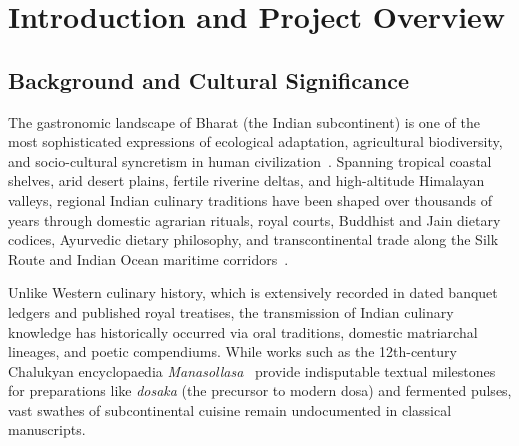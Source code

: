 \documentclass[11pt,a4paper]{report}
\begin{document}
\clearpage

\tableofcontents
\clearpage

\listoffigures
\vspace{1cm}
\listoftables
\clearpage

\setcounter{page}{1}

\chapter{Introduction and Project Overview}

\section{Background and Cultural Significance}
The gastronomic landscape of Bharat (the Indian subcontinent) is one of the most sophisticated expressions of ecological adaptation, agricultural biodiversity, and socio-cultural syncretism in human civilization~\cite{achaya1994indian}. Spanning tropical coastal shelves, arid desert plains, fertile riverine deltas, and high-altitude Himalayan valleys, regional Indian culinary traditions have been shaped over thousands of years through domestic agrarian rituals, royal courts, Buddhist and Jain dietary codices, Ayurvedic dietary philosophy, and transcontinental trade along the Silk Route and Indian Ocean maritime corridors~\cite{sen2004food}.

Unlike Western culinary history, which is extensively recorded in dated banquet ledgers and published royal treatises, the transmission of Indian culinary knowledge has historically occurred via oral traditions, domestic matriarchal lineages, and poetic compendiums. While works such as the 12th-century Chalukyan encyclopaedia \emph{Manasollasa}~\cite{someshvara1130manasollasa} provide indisputable textual milestones for preparations like \emph{dosaka} (the precursor to modern dosa) and fermented pulses, vast swathes of subcontinental cuisine remain undocumented in classical manuscripts.
\end{document}
